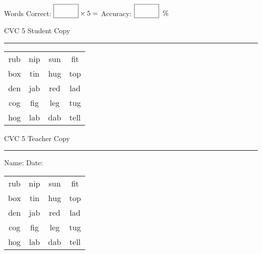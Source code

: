 \documentclass{memoir}
\begin{document}
\normalsize

Words Correct: $\fbox{\phantom{\huge 100}} \times 5 = $ Accuracy: $\fbox{\phantom{\huge 100}}\;\; \%$ 

\vfill

\newpage


\footnotesize \noindent
CVC 5 \hfill Student Copy
\smallskip
\hrule

\huge

\setlength{\tabcolsep}{14pt}
\def\arraystretch{2}

{\selectfont


\begin{vplace}[0.5]
\begin{center}
\begin{tabular}{cccc}
rub & nip & sun & fit \\
box & tin & hug & top \\
den & jab & red & lad \\
cog & fig & leg & tug \\
hog & lab & dab & tell \\
\end{tabular}
\end{center}
\end{vplace}

}

\newpage

\footnotesize \noindent
CVC 5 \hfill Teacher Copy
\smallskip
\hrule

\normalsize

\vfill

\noindent
Name: \underline{\hspace{1.75in}} \hfill Date: \underline{\hspace{1in}}

\huge

{\selectfont


\begin{vplace}[0.5]
\begin{center}
\begin{tabular}{cccc}
rub & nip & sun & fit \\
box & tin & hug & top \\
den & jab & red & lad \\
cog & fig & leg & tug \\
hog & lab & dab & tell \\
\end{tabular}
\end{center}
\end{vplace}



}
\end{document}
